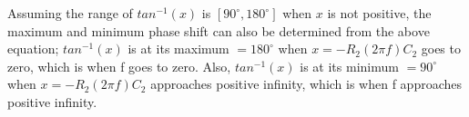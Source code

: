 \documentclass{article}
\begin{document}
Assuming the range of $tan^{-1}(x)$ is $[90^{\circ},180^{\circ}]$ when $x$ is not positive, the maximum and minimum phase shift can also be determined from the above equation; $tan^{-1}(x)$ is at its maximum $=180^{\circ}$ when $x=-R_2(2\pi f) C_2$ goes to zero, which is when f goes to zero. Also, $tan^{-1}(x)$ is at its minimum $=90^{\circ}$ when $x=-R_2(2\pi f) C_2$ approaches positive infinity, which is when f approaches positive infinity.

\newpage
\end{document}
